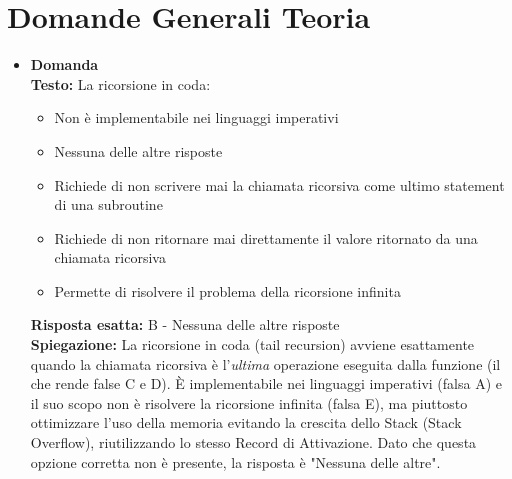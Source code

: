 \documentclass[12pt, a4paper]{article}
\newcounter{domandateoria}
\begin{document}
\section{Domande Generali Teoria}

\begin{itemize}
    \item {}\textbf{Domanda \thedomandateoria} \\
    \textbf{Testo:} La ricorsione in coda:
    \begin{itemize}
        \item[A)] Non è implementabile nei linguaggi imperativi
        \item[B)] Nessuna delle altre risposte
        \item[C)] Richiede di non scrivere mai la chiamata ricorsiva come ultimo statement di una subroutine
        \item[D)] Richiede di non ritornare mai direttamente il valore ritornato da una chiamata ricorsiva
        \item[E)] Permette di risolvere il problema della ricorsione infinita
    \end{itemize}
    \textbf{Risposta esatta:} B - Nessuna delle altre risposte \\
    \textbf{Spiegazione:} La ricorsione in coda (tail recursion) avviene esattamente quando la chiamata ricorsiva è l'\textit{ultima} operazione eseguita dalla funzione (il che rende false C e D). È implementabile nei linguaggi imperativi (falsa A) e il suo scopo non è risolvere la ricorsione infinita (falsa E), ma piuttosto ottimizzare l'uso della memoria evitando la crescita dello Stack (Stack Overflow), riutilizzando lo stesso Record di Attivazione. Dato che questa opzione corretta non è presente, la risposta è "Nessuna delle altre".
    \vspace{0.3cm}


\end{itemize}
\end{document}

